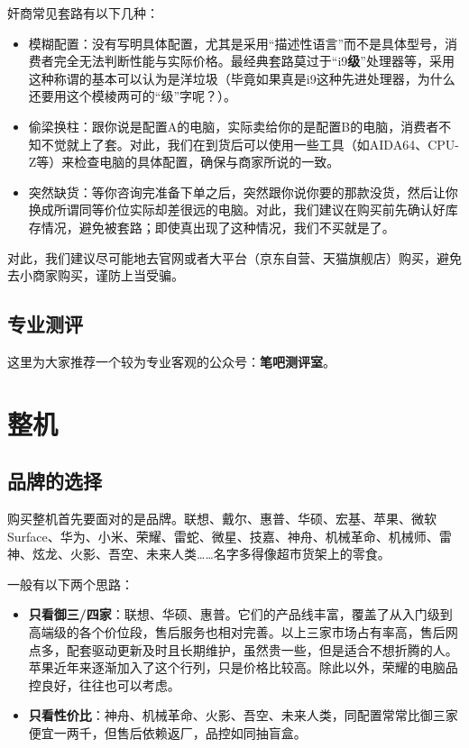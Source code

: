 \documentclass[../main.tex]{subfiles}
\begin{document}
奸商常见套路有以下几种：
\begin{itemize}
  \item 模糊配置：没有写明具体配置，尤其是采用“描述性语言”而不是具体型号，消费者完全无法判断性能与实际价格。最经典套路莫过于“i9\textbf{级}”处理器等，采用这种称谓的基本可以认为是洋垃圾（毕竟如果真是i9这种先进处理器，为什么还要用这个模棱两可的“级”字呢？）。
  \item 偷梁换柱：跟你说是配置A的电脑，实际卖给你的是配置B的电脑，消费者不知不觉就上了套。对此，我们在到货后可以使用一些工具（如AIDA64、CPU-Z等）来检查电脑的具体配置，确保与商家所说的一致。
  \item 突然缺货：等你咨询完准备下单之后，突然跟你说你要的那款没货，然后让你换成所谓同等价位实际却差很远的电脑。对此，我们建议在购买前先确认好库存情况，避免被套路；即使真出现了这种情况，我们不买就是了。
\end{itemize}
对此，我们建议尽可能地去官网或者大平台（京东自营、天猫旗舰店）购买，避免去小商家购买，谨防上当受骗。

\subsection{专业测评}

这里为大家推荐一个较为专业客观的公众号：\textbf{笔吧测评室}。

\section{整机}

\subsection{品牌的选择}

购买整机首先要面对的是品牌。联想、戴尔、惠普、华硕、宏基、苹果、微软 Surface、华为、小米、荣耀、雷蛇、微星、技嘉、神舟、机械革命、机械师、雷神、炫龙、火影、吾空、未来人类……名字多得像超市货架上的零食。

一般有以下两个思路：

\begin{itemize}
  \item \textbf{只看御三/四家}：联想、华硕、惠普。它们的产品线丰富，覆盖了从入门级到高端级的各个价位段，售后服务也相对完善。以上三家市场占有率高，售后网点多，配套驱动更新及时且长期维护，虽然贵一些，但是适合不想折腾的人。苹果近年来逐渐加入了这个行列，只是价格比较高。除此以外，荣耀的电脑品控良好，往往也可以考虑。

  \item \textbf{只看性价比}：神舟、机械革命、火影、吾空、未来人类，同配置常常比御三家便宜一两千，但售后依赖返厂，品控如同抽盲盒。
\end{itemize}
\end{document}
